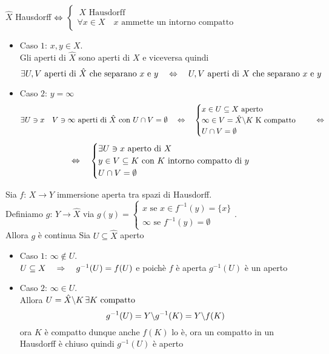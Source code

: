 \begin{prop}\label{compatt_Haus} $\hat{X}$ Hausdorff $\Leftrightarrow$ $\begin{cases}\ X \text{ Hausdorff} \\ \forall x\in X \quad  x\text{ ammette un intorno compatto } \end{cases}$
\proof \bbianco
\begin{itemize}
\item Caso $1$: $x,y\in X$.\\Gli aperti di $\hat{X}$ sono aperti di $X$  e viceversa quindi 
$$ \exists U,V \text{ aperti di } \hat{X} \text{ che separano } x \text{ e } y \quad \Leftrightarrow \quad  U,V \text{ aperti di } {X} \text{ che separano } x \text{ e } y$$
\item Caso $2$: $y = \infty$
$$ \exists U \ni x \quad V \ni \infty \text{ aperti di } \hat{X} \text{ con } U \cap V = \emptyset \quad 
\Leftrightarrow \quad \begin{cases} x \in U \subseteq X \text{ aperto } \\ \infty \in V = \hat{X}\backslash K \text{ K compatto }  \\ U \cap V = \emptyset
\end{cases} \quad \Leftrightarrow$$
$$ \Leftrightarrow \quad \begin{cases}\exists U \ni x \text{ aperto di } X \\
 y\in V \subseteq K  \text{ con } K \text{ intorno compatto di } y\\
 U \cap V = \emptyset
\end{cases}$$
\end{itemize}
\endproof
\end{prop}
\spazio
\begin{prop}Sia $f:\, X \to Y $ immersione aperta tra spazi di Hausdorff.\\
Definiamo $g:\, Y \to \hat{X}$ via $g(y) = \begin{cases} x \text{ se } x \in f^{-1}(y)=\{ x \}\\
\infty \text{ se } f^{-1}(y)=\emptyset
\end{cases}$.\\
Allora $g$ \`e continua
\proof Sia $U \subseteq \hat X $ aperto 
\begin{itemize}
\item Caso $1$: $\infty \not \in U $.\\
$ U\subseteq X \quad \Rightarrow \quad g^{-1}(U)=f(U)$ e poich\`e $f$ \`e aperta $g^{-1}(U)$ \`e un aperto 
\item Caso $2$: $\infty \in U$.\\
Allora $ U = \hat{X}\backslash K \, \exists K \text{ compatto }$
$$g^{-1}(U) = Y \backslash g^{-1}(K) = Y \backslash f(K)$$
ora $K$ \`e compatto dunque anche $f(K)$ lo \`e, ora un compatto in un Hausdorff \`e chiuso quindi $g^{-1}(U)$ \`e aperto
\end{itemize}
\endproof
\end{prop}
